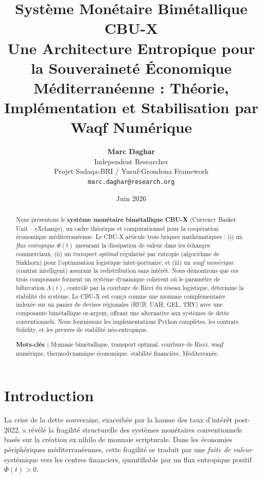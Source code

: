 \documentclass[11pt,a4paper]{article}
\title{
    \textbf{Système Monétaire Bimétallique CBU-X}\\[0.3em]
    \large Une Architecture Entropique pour la Souveraineté Économique \\
    Méditerranéenne : Théorie, Implémentation et Stabilisation par Waqf Numérique
}
\author{
    \textbf{Marc Daghar}\\
    Independent Researcher\\
    Projet Sadaqa-BRI / Yusuf-Grondona Framework\\
    \texttt{marc.daghar@research.org}
}
\date{Juin 2026}
\theoremstyle{definition}
\theoremstyle{remark}
\begin{document}
\maketitle

\begin{abstract}
Nous présentons le \textbf{système monétaire bimétallique CBU-X} (Currency Basket Unit -- eXchange), un cadre théorique et computationnel pour la coopération économique méditerranéenne. Le CBU-X articule trois briques mathématiques : (i) un \textit{flux entropique} $\Phi(t)$ mesurant la dissipation de valeur dans les échanges commerciaux, (ii) un \textit{transport optimal} régularisé par entropie (algorithme de Sinkhorn) pour l'optimisation logistique inter-portuaire, et (iii) un \textit{waqf numérique} (contrat intelligent) assurant la redistribution sans intérêt. Nous démontrons que ces trois composants forment un système dynamique cohérent où le paramètre de bifurcation $\Lambda(t)$, contrôlé par la courbure de Ricci du réseau logistique, détermine la stabilité du système. Le CBU-X est conçu comme une monnaie complémentaire indexée sur un panier de devises régionales (RUB, UAH, GEL, TRY) avec une composante bimétallique or-argent, offrant une alternative aux systèmes de dette conventionnels. Nous fournissons les implémentations Python complètes, les contrats Solidity, et les preuves de stabilité néo-entropique.

\textbf{Mots-clés :} Monnaie bimétallique, transport optimal, courbure de Ricci, waqf numérique, thermodynamique économique, stabilité financière, Méditerranée.
\end{abstract}

\section{Introduction}
\label{sec:intro}

La crise de la dette souveraine, exacerbée par la hausse des taux d'intérêt post-2022, a révélé la fragilité structurelle des systèmes monétaires conventionnels basés sur la création ex nihilo de monnaie scripturale. Dans les économies périphériques méditerranéennes, cette fragilité se traduit par une \textit{fuite de valeur} systémique vers les centres financiers, quantifiable par un flux entropique positif $\Phi(t) > 0$.
\end{document}
